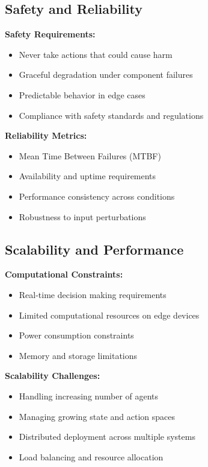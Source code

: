 \begin{intuitionbox}
\subsection{Safety and Reliability}

\textbf{Safety Requirements:}
\begin{itemize}
    \item Never take actions that could cause harm
    \item Graceful degradation under component failures
    \item Predictable behavior in edge cases
    \item Compliance with safety standards and regulations
\end{itemize}

\textbf{Reliability Metrics:}
\begin{itemize}
    \item Mean Time Between Failures (MTBF)
    \item Availability and uptime requirements
    \item Performance consistency across conditions
    \item Robustness to input perturbations
\end{itemize}

\subsection{Scalability and Performance}

\textbf{Computational Constraints:}
\begin{itemize}
    \item Real-time decision making requirements
    \item Limited computational resources on edge devices
    \item Power consumption constraints
    \item Memory and storage limitations
\end{itemize}

\textbf{Scalability Challenges:}
\begin{itemize}
    \item Handling increasing number of agents
    \item Managing growing state and action spaces
    \item Distributed deployment across multiple systems
    \item Load balancing and resource allocation
\end{itemize}


\end{intuitionbox}
